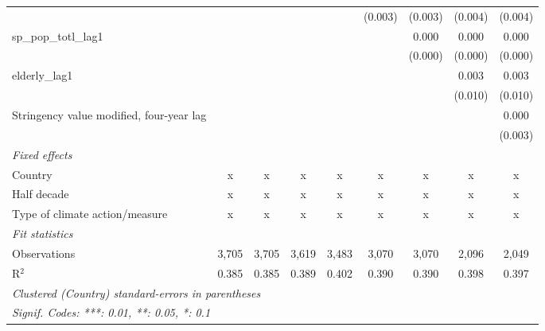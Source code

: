 \begin{tabular}{lcccccccc}
                                                            &             &             &             &              & (0.003)       & (0.003)       & (0.004)      & (0.004)\\   
   sp\_pop\_totl\_lag1                                      &             &             &             &              &               & 0.000         & 0.000        & 0.000\\   
                                                            &             &             &             &              &               & (0.000)       & (0.000)      & (0.000)\\   
   elderly\_lag1                                            &             &             &             &              &               &               & 0.003        & 0.003\\   
                                                            &             &             &             &              &               &               & (0.010)      & (0.010)\\   
   Stringency value modified, four-year lag                 &             &             &             &              &               &               &              & 0.000\\   
                                                            &             &             &             &              &               &               &              & (0.003)\\   
   \emph{Fixed effects}\\
   Country                                                  & x           & x           & x           & x            & x             & x             & x            & x\\  
   Half decade                                              & x           & x           & x           & x            & x             & x             & x            & x\\  
   Type of climate action/measure                           & x           & x           & x           & x            & x             & x             & x            & x\\  
   \midrule \emph{Fit statistics}\\
   Observations                                             & 3,705       & 3,705       & 3,619       & 3,483        & 3,070         & 3,070         & 2,096        & 2,049\\  
   R$^2$                                                    & 0.385       & 0.385       & 0.389       & 0.402        & 0.390         & 0.390         & 0.398        & 0.397\\  
   \midrule
   \multicolumn{9}{l}{\emph{Clustered (Country) standard-errors in parentheses}}\\
   \multicolumn{9}{l}{\emph{Signif. Codes: ***: 0.01, **: 0.05, *: 0.1}}\\
\end{tabular}
\par\endgroup


